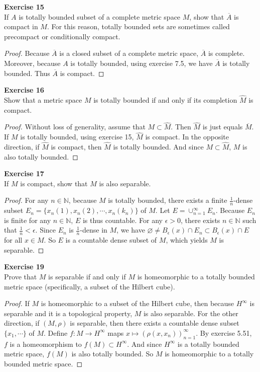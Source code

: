 \documentclass[12pt, a4paper]{article}
\theoremstyle{plain}
\newcommand{\N}{\mathbb{N}}
\newenvironment{exercise}[2][Exercise]
    { \begin{mdframed}[backgroundcolor=gray!20] \textbf{#1 #2} \\}
    {  \end{mdframed}}
\begin{document}
\begin{exercise}{15}
If $A$ is totally bounded subset of a complete metric space $M$, show that $\overline{A}$ is compact in $M$. For this reason, totally bounded sets are sometimes called precompact or conditionally compact.
\end{exercise}
	\begin{proof}
	Because $\overline{A}$ is a closed subset of a complete metric space, $\overline{A}$ is complete. Moreover, because $A$ is totally bounded, using exercise 7.5, we have $\overline{A}$ is totally bounded. Thus $\overline{A}$ is compact.
	\end{proof}

\begin{exercise}{16}
Show that a metric space $M$ is totally bounded if and only if its completion $\hat{M}$ is compact.
\end{exercise}
	\begin{proof}
	Without loss of generality, assume that $M\subset \hat{M}$. Then $\hat{M}$ is just equals $\overline{M}$. If $M$ is totally bounded, using exercise 15, $\hat{M}$ is compact. In the opposite direction, if $\hat{M}$ is compact, then $\hat{M}$ is totally bounded. And since $M\subset \hat{M}$, $M$ is also totally bounded.
	\end{proof}

\begin{exercise}{17}
If $M$ is compact, show that $M$ is also separable.
\end{exercise}
	\begin{proof}
	For any $n\in \N$, because $M$ is totally bounded, there exists a finite $\frac{1}{n}$-dense subset $E_n = \{x_n(1),x_n(2),\cdots ,x_n(k_n)\}$ of $M$. Let $E=\cup_{n=1}^\infty E_n$. Because $E_n$ is finite for any $n\in\N$, $E$ is thus countable. For any $\epsilon>0$, there exists $n\in \N$ such that $\frac{1}{n}<\epsilon$. Since $E_n$ is $\frac{1}{n}$-dense in $M$, we have $\varnothing\neq B_\epsilon(x)\cap E_n\subset B_\epsilon(x)\cap E$ for all $x\in M$. So $E$ is a countable dense subset of $M$, which yields $M$ is separable.
	\end{proof}

\begin{exercise}{19}
Prove that $M$ is separable if and only if $M$ is homeomorphic to a totally bounded metric space (specifically, a subset of the Hilbert cube).
\end{exercise}
	\begin{proof}
	If $M$ is homeomorphic to a subset of the Hilbert cube, then because $H^\infty$ is separable and it is a topological property, $M$ is also separable. For the other direction, if $(M,\rho)$ is separable, then there exists a countable dense subset $\{x_1,\cdots\}$ of $M$. Define $f:M\rightarrow H^{\infty}$ maps $x\mapsto (\rho(x,x_n))_{n=1}^\infty$. By exercise 5.51, $f$ is a homeomorphism to $f(M)\subset H^\infty$. And since $H^\infty$ is a totally bounded metric space, $f(M)$ is also totally bounded. So $M$ is homeomorphic to a totally bounded metric space.
	\end{proof}
\end{document}
